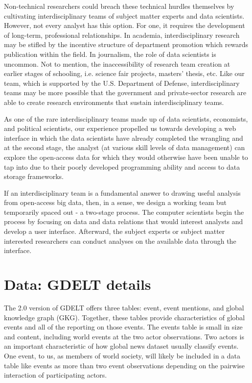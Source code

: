 \documentclass[preprint,authoryear,12pt]{elsarticle/elsarticle}
\begin{document}
Non-technical researchers could breach these technical hurdles themselves by cultivating interdisciplinary teams of subject matter experts and data scientists. However, not every analyst has this option. For one, it requires the development of long-term, professional relationships. In academia, interdisciplinary research may be stifled by the incentive structure of department promotion which rewards publication within the field. In journalism, the role of data scientists is uncommon. Not to mention, the inaccessibility of research team creation at earlier stages of schooling, i.e. science fair projects, masters’ thesis, etc. Like our team, which is supported by the U.S. Department of Defense, interdisciplinary teams may be more possible that the government and private-sector research are able to create research environments that sustain interdisciplinary teams.

As one of the rare interdisciplinary teams made up of data scientists, economists, and political scientists, our experience propelled us towards developing a web interface in which the data scientists have already completed the wrangling and at the second stage, the analyst (at various skill levels of data management) can explore the open-access data for which they would otherwise have been unable to tap into due to their poorly developed programming ability and access to data storage frameworks. 

If an interdisciplinary team is a fundamental answer to drawing useful analysis from open-access big data, then, in a sense, we design a working team but temporarily spaced out - a two-stage process. The computer scientists begin the process by focusing on data and data relations that would interest analysts and develop a user interface. Afterward, the subject experts or subject matter interested researchers can conduct analyses on the available data through the interface. 

\section{Data: GDELT details}
The 2.0 version of GDELT offers three tables: event, event mentions, and global knowledge graph (GKG). Together, these tables provide characteristics of global events and all of the reporting on those events. The events table is small in size and content, including world events at the two actor observations. Two actors is an important characteristic of how global news dataset usually classify events. One event, to us, as members of world society, will likely be included in a data table like events as more than two event observations depending on the pairwise interaction of participating actors. 
\end{document}

